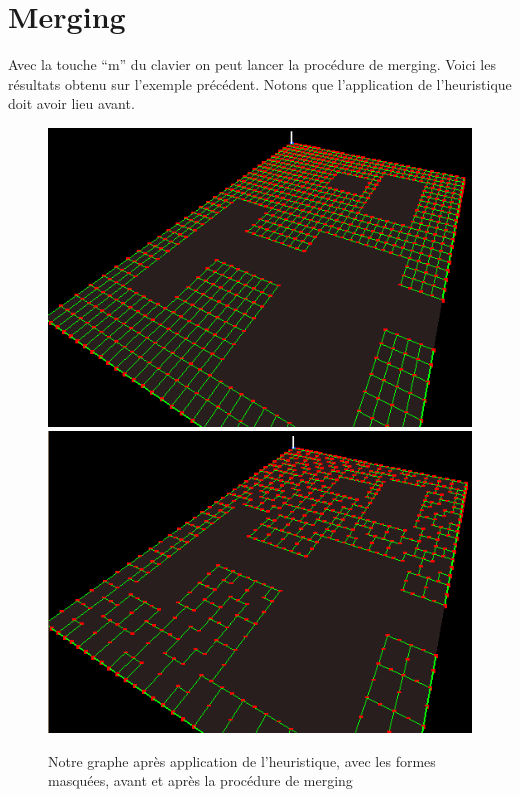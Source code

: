 \documentclass[a4paper,12pt]{report}
\begin{document}
\newpage

\section{Merging}
 
Avec la touche ``m'' du clavier on peut lancer la procédure de merging. Voici les résultats obtenu sur l'exemple précédent. Notons que l'application de l'heuristique doit avoir lieu avant. 

\begin{figure}[h]
\centering
\includegraphics[scale=0.5]{Images/heuristique3.png}
\includegraphics[scale=0.5]{Images/merging3.png}
\caption{Notre graphe après application de l'heuristique, avec les formes masquées, avant et après la procédure de merging}
\end{figure}
\vspace{0.5cm}
\end{document}
